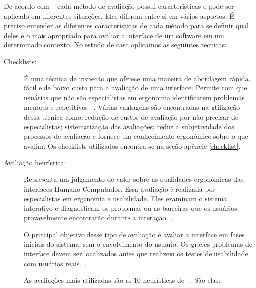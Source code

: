 De acordo com ~ cada método de avaliação possui características e pode ser aplicado em diferentes situações.
%
Eles diferem entre si em vários aspectos. É preciso entender as diferentes características de cada método para se definir qual deles é o mais apropriado para avaliar a interface de um software em um determinado contexto.
%
No estudo de caso aplicamos as seguintes técnicas:

\begin{description}

\item[Checklists:]

	É uma técnica de inspeção que oferece uma maneira de abordagem rápida, fácil e de baixo custo para a avaliação de uma interface. Permite com que usuários que não são especialistas em ergonomia identificarem problemas menores e repetitivos ~\cite{cybis2010}.
%
Várias vantagens são encontradas na utilização dessa técnica como: redução de custos de avaliação por não precisar de especialistas; sistematização das avaliações; reduz a subjetividade dos processos de avaliação e fornece um conhecimento ergonômico sobre o que avaliar.
%
Os checklists utilizados encontra-se na seção apêncie \ref{checklist}.

\item[Avaliação heurística:]


	Representa um julgamento de valor sobre as qualidades ergonômicas das interfaces Humano-Computador. Essa avaliação é realizada por especialistas em ergonomia e usabilidade. Eles examinam o sistema interativo e diagnosticam os problemas ou as barreiras que os usuários provavelmente encontrarão durante a interação ~\cite{cybis2010}.

	O principal objetivo desse tipo de avaliação é avaliar a interface em fases iniciais do sistema, sem o envolvimento do usuário. Os graves problemas de interface devem ser localizados antes que realizem os testes de usabilidade com usuários reais ~\cite{santos2012}.

	As avaliações mais utilizadas são as 10 heurísticas de ~. São elas:


\end{description}
